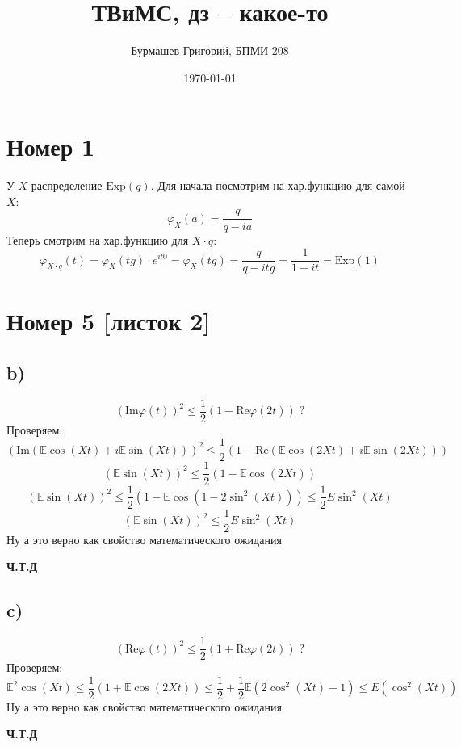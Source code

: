 \documentclass[a4paper,12pt]{article}
\author{Бурмашев Григорий, БПМИ-208}
\title{ТВиМС, дз -- какое-то}
\date{\today}
\begin{document}
\maketitle
\clearpage
\section*{Номер 1}
У $X$ распределение $\text{Exp}(q)$. Для начала посмотрим на хар.функцию для самой $X$:
\[
\varphi_X(a) = \frac{q}{q - ia}
\]
Теперь смотрим на хар.функцию для $X \cdot q$:
\[
\varphi_{X \cdot q}(t) = \varphi_X (tg) \cdot e^{it0} = \varphi_X(tg)=  \frac{q}{q - itg} = \frac{1}{1 - it} = \text{Exp}(1)
\]
\section*{Номер 5 [листок 2]}
\subsection*{b)}
\[
(\text{Im} \varphi(t))^2 \leq \frac{1}{2} \left(1 - \text{Re} \varphi(2t)\right) \; ?
\]
Проверяем:
\[
\left(
 \text{Im} \left(
\mathbb{E} \cos (Xt) + i \mathbb{E} \sin (Xt)
\right)
 \right)^2
\leq  
\frac{1}{2}
 \left(
1 - \text{Re}
\left(
\mathbb{E} \cos (2Xt) + i \mathbb{E} \sin (2Xt)
\right)
\right)
\]
\[
\left( \mathbb{E} \sin (Xt) \right)^2 \leq \frac{1}{2} \left(
1 - \mathbb{E} \cos (2 X t)
\right)
\]
\[
\left( \mathbb{E} \sin (Xt) \right)^2 \leq \frac{1}{2} \left(
1 - \mathbb{E} \cos (1 - 2 \sin^2 (Xt)) 
\right)
\leq
\frac{1}{2} E \sin^2 (Xt)
\]
\[
\left( \mathbb{E} \sin (Xt) \right)^2   \leq \frac{1}{2} E \sin^2 (Xt)
\]
Ну а это верно как свойство математического ожидания
\begin{center}
\textbf{Ч.Т.Д} 
\end{center}
\subsection*{c)}
\[
\left(
\text{Re} \varphi(t)
\right)^2 
\leq
\frac{1}{2}
\left(
1 + \text{Re}\varphi(2t)
\right) \; ?
\]
Проверяем:
\[
\mathbb{E}^2 \cos (Xt) \leq \frac{1}{2} \left(
1 + \mathbb{E} \cos (2Xt)
\right) \leq \frac{1}{2} + \frac{1}{2} \mathbb{E} \left(2 \cos^2 (Xt) - 1\right) \leq E \left(\cos^2 (Xt)\right)
\]
Ну а это верно как свойство математического ожидания
\begin{center}
\textbf{Ч.Т.Д} 
\end{center}
\clearpage
\end{document}

